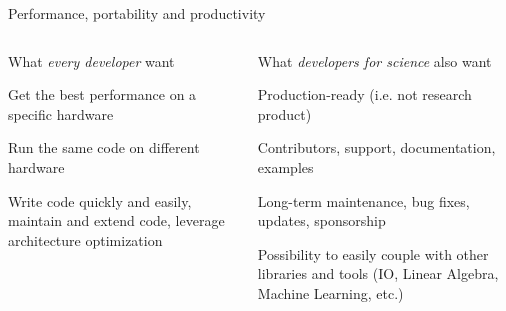 \documentclass[aspectratio=169]{beamer}
\begin{document}
\begin{frame}{Performance, portability and productivity}
    \begin{columns}[T]
        \begin{column}{0.45\linewidth}
            What \emph{every developer} want

            \vspace{1em}

            \begin{description}[Performance]
                \item[Performance] Get the best performance on a specific hardware
                \item[Portability] Run the same code on different hardware
                \item[Productivity] Write code quickly and easily, maintain and extend code, leverage architecture optimization
            \end{description}
        \end{column}
        \begin{column}{0.55\linewidth}
            What \emph{developers for science} also want

            \vspace{1em}

            \begin{description}[Interporability]
                \item[Maturity] Production-ready (i.e. not research product)
                \item[Community] Contributors, support, documentation, examples
                \item[Longevity] Long-term maintenance, bug fixes, updates, sponsorship
                \item[Interporability] Possibility to easily couple with other libraries and tools (IO, Linear Algebra, Machine Learning, etc.)
            \end{description}
        \end{column}
    \end{columns}
\end{frame}

\end{document}
